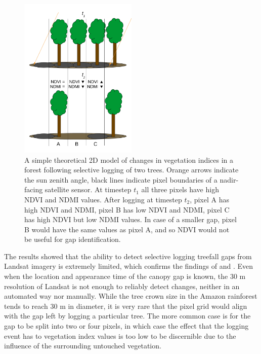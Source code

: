 \documentclass[a4paper,12pt]{scrbook}
\begin{document}
\begin{figure}
  \centering
  \includegraphics[width=0.5\textwidth]{thesis-figures/15-gap-vi-model}
  \caption{A simple theoretical 2D model of changes in vegetation indices in a forest following selective logging of two trees. Orange arrows indicate the sun zenith angle, black lines indicate pixel boundaries of a nadir-facing satellite sensor. At timestep $ t_{1} $ all three pixels have high \ac{NDVI} and \ac{NDMI} values. After logging at timestep $ t_{2} $, pixel A has high \ac{NDVI} and \ac{NDMI}, pixel B has low \ac{NDVI} and \ac{NDMI}, pixel C has high \ac{NDVI} but low \ac{NDMI} values. In case of a smaller gap, pixel B would have the same values as pixel A, and so \ac{NDVI} would not be useful for gap identification.}
  \label{fig-gap-vi-model}
\end{figure}


The results showed that the ability to detect selective logging treefall gaps from Landsat imagery is extremely limited, which confirms the findings of \citet{asner_remote_2002} and \citet{asner_canopy_2004}. Even when the location and appearance time of the canopy gap is known, the 30 m resolution of Landsat is not enough to reliably detect changes, neither in an automated way nor manually. While the tree crown size in the Amazon rainforest tends to reach 30 m in diameter, it is very rare that the pixel grid would align with the gap left by logging a particular tree. The more common case is for the gap to be split into two or four pixels, in which case the effect that the logging event has to vegetation index values is too low to be discernible due to the influence of the surrounding untouched vegetation.
\end{document}
